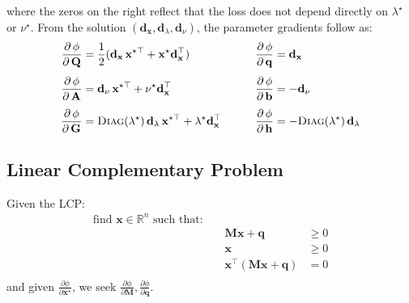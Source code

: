 \documentclass{article}
\newcommand{\pd}[2]{\dfrac{\partial\, #1}{\partial\, #2}}
\newcommand{\pdc}[2]{\frac{\partial #1}{\partial #2}}
\begin{document}
where the zeros on the right reflect that the loss does not depend directly on $\lambda^\star$ or $\nu^\star$. From the solution $(\mathbf{d}_\mathbf{x}, \mathbf{d}_\lambda, \mathbf{d}_\nu)$, the parameter gradients follow as:
\begin{equation}
\label{eq:optnet_gradients}
\begin{aligned}
    \pd{\phi}{\mathbf{Q}} &= \frac{1}{2}(\mathbf{d}_\mathbf{x}\,\mathbf{x}^{\star\top} + \mathbf{x}^\star\mathbf{d}_\mathbf{x}^\top) 
    &\qquad
    \pd{\phi}{\mathbf{q}} &= \mathbf{d}_\mathbf{x} \\[1ex]
    \pd{\phi}{\mathbf{A}} &= \mathbf{d}_\nu\,\mathbf{x}^{\star\top} + \nu^\star\mathbf{d}_\mathbf{x}^\top 
    &\qquad
    \pd{\phi}{\mathbf{b}} &= -\mathbf{d}_\nu \\[1ex]
    \pd{\phi}{\mathbf{G}} &= \textsc{Diag}(\lambda^\star)\,\mathbf{d}_\lambda\,\mathbf{x}^{\star\top} + \lambda^\star\mathbf{d}_\mathbf{x}^\top 
    &\qquad
    \pd{\phi}{\mathbf{h}} &= -\textsc{Diag}(\lambda^\star)\,\mathbf{d}_\lambda
\end{aligned}
\end{equation}

\subsection{Linear Complementary Problem}
Given the LCP:
\begin{align*}
    \text{find } \mathbf{x} \in \mathbb{R}^n \text{ such that: } \\
    &&\mathbf{M}\mathbf{x} + \mathbf{q} &\ge 0 \\
    &&\mathbf{x} &\ge 0 \\
    &&\mathbf{x}^\top(\mathbf{M}\mathbf{x} + \mathbf{q}) &= 0 \\
\end{align*}
and given $\pdc{\phi}{\mathbf{x}^\star}$, we seek $\pdc{\phi}{\mathbf{M}}, \pdc{\phi}{\mathbf{q}}$.
\end{document}
